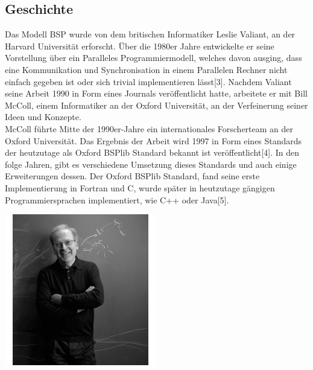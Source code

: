 \documentclass[a4paper,10pt]{scrartcl}
\begin{document}
\subsection{Geschichte}
\begin{minipage}{0.6\textwidth}
Das Modell BSP wurde von dem britischen Informatiker Leslie Valiant, an der Harvard Universität erforscht. Über die 1980er Jahre entwickelte er seine Vorstellung über ein Paralleles Programmiermodell, welches davon ausging, dass eine Kommunikation und Synchronisation in einem Parallelen Rechner nicht einfach gegeben ist oder sich trivial implementieren lässt[3]. Nachdem Valiant seine Arbeit 1990 in Form eines Journals veröffentlicht hatte, arbeitete er mit Bill McColl, einem Informatiker an der Oxford Universität, an der Verfeinerung seiner Ideen und Konzepte.\\
McColl führte Mitte der 1990er-Jahre ein internationales Forscherteam an der Oxford Universität. Das Ergebnis der Arbeit wird 1997 in Form eines Standards der heutzutage als Oxford BSPlib Standard bekannt ist veröffentlicht[4]. In den folge Jahren, gibt es verschiedene Umsetzung dieses Standards und auch einige Erweiterungen dessen. Der Oxford BSPlib Standard, fand seine erste Implementierung in Fortran und C, wurde später in heutzutage gängigen Programmiersprachen implementiert, wie C++ oder Java[5].
\end{minipage}
\begin{minipage}{0.4\textwidth}

\includegraphics[scale=1.3]{LeslieValiantBW.png}



\end{minipage}
\end{document}
